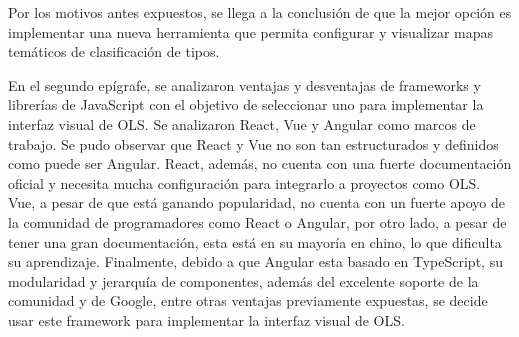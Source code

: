 Por los motivos antes expuestos, se llega a la conclusi\'on de que la mejor opci\'on es implementar una nueva herramienta que permita configurar y visualizar mapas tem\'aticos de clasificaci\'on de tipos.

En el segundo ep\'igrafe, se analizaron ventajas y desventajas de frameworks y librer\'ias de JavaScript con el objetivo de seleccionar uno para implementar la interfaz visual de OLS. Se analizaron React, Vue y Angular como marcos de trabajo. Se pudo observar que React y Vue no son tan estructurados y definidos como puede ser Angular. React, adem\'as, no cuenta con una fuerte documentaci\'on oficial y necesita mucha configuraci\'on para integrarlo a proyectos como OLS. Vue, a pesar de que est\'a ganando popularidad, no cuenta con un fuerte apoyo de la comunidad de programadores como React o Angular, por otro lado, a pesar de tener una gran documentaci\'on, esta est\'a en su mayor\'ia en chino, lo que dificulta su aprendizaje. Finalmente, debido a que Angular esta basado en TypeScript, su modularidad y jerarqu\'ia de componentes, adem\'as del excelente soporte de la comunidad y de Google, entre otras ventajas previamente expuestas, se decide usar este framework para implementar la interfaz visual de OLS.
